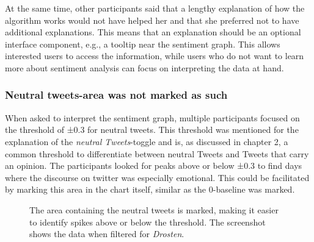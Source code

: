 At the same time, other participants said that a lengthy explanation of how the algorithm works would not have helped her and that she preferred not to have additional explanations. This means that an explanation should be an optional interface component, e.g., a tooltip near the sentiment graph. This allows interested users to access the information, while users who do not want to learn more about sentiment analysis can focus on interpreting the data at hand.

\subsubsection*{Neutral tweets-area was not marked as such}
When asked to interpret the sentiment graph, multiple participants focused on the threshold of ±0.3 for neutral tweets. This threshold was mentioned for the explanation of the \emph{neutral Tweets}-toggle and is, as discussed in chapter 2, a common threshold to differentiate between neutral Tweets and Tweets that carry an opinion. The participants looked for peaks above or below ±0.3 to find days where the discourse on twitter was especially emotional. This could be facilitated by marking this area in the chart itself, similar as the 0-baseline was marked. 

\begin{figure}[htbp]
    \caption{The area containing the neutral tweets is marked, making it easier to identify spikes above or below the threshold. The screenshot shows the data when filtered for \emph{Drosten}.}
    \label{fig:sentiment_neutral_area}
\end{figure}

